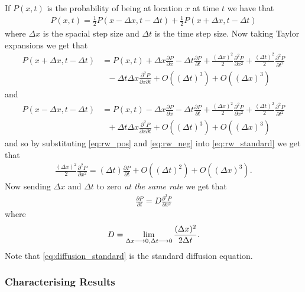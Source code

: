 If $ P(x,t) $ is the probability of being at location $ x $ at time $ t $ we have that
\begin{align}
    \label{eq:rw_standard}
    P(x,t) = \frac{1}{2}P(x-\Delta x, t - \Delta t) + \frac{1}{2}P(x + \Delta x, t - \Delta t)
\end{align}
where $ \Delta x $ is the spacial step size and $ \Delta t $ is the time step size.
Now taking Taylor expansions we get that
\begin{align}
    \label{eq:rw_pos}
    P(x + \Delta x, t - \Delta t) &= P(x,t) + \Delta x \frac{\partial P}{\partial x} - \Delta t \frac{\partial P}{\partial t} + \frac{(\Delta x)^2}{2} \frac{\partial^2 P}{\partial x^2} + \frac{(\Delta t)^2}{2} \frac{\partial^2 P}{\partial t^2} \\ 
    & \ \ \ - \Delta t \Delta x \frac{\partial^2 P}{\partial x \partial t} + O((\Delta t)^3) + O(( \Delta x)^3) \nonumber
\end{align}
and
\begin{align}
    \label{eq:rw_neg}
    P(x - \Delta x, t - \Delta t) &= P(x,t) - \Delta x \frac{\partial P}{\partial x} - \Delta t \frac{\partial P}{\partial t} + \frac{(\Delta x)^2}{2} \frac{\partial^2 P}{\partial x^2} + \frac{(\Delta t)^2}{2} \frac{\partial^2 P}{\partial t^2} \\ 
    & \ \ \ + \Delta t \Delta x \frac{\partial^2 P}{\partial x \partial t} + O((\Delta t)^3) + O(( \Delta x)^3) \nonumber
\end{align}
and so by substituting \eqref{eq:rw_pos} and \eqref{eq:rw_neg} into \eqref{eq:rw_standard} we get that
\begin{align}
    \frac{(\Delta x)^2}{2}\frac{\partial^2 P}{\partial x^2} = (\Delta t) \frac{\partial P}{\partial t} + O((\Delta t)^2) + O((\Delta x)^3).
\end{align}
Now sending $ \Delta x $ and $ \Delta t $ to zero \emph{at the same rate} we get that
\begin{align*}
    \label{eq:diffusion_standard}
    \frac{\partial P}{\partial t} = D \frac{\partial^2 P}{\partial x^2}
\end{align*}
where
\begin{align}
    D = \lim_{\Delta x \longrightarrow 0, \Delta t \longrightarrow 0} \frac{(\Delta x)^2}{2 \Delta t}.
\end{align}
Note that \eqref{eq:diffusion_standard} is the standard diffusion equation.

\subsubsection{Characterising Results}

